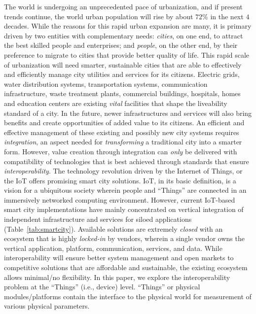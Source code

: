 \documentclass[conference]{IEEEtran}
\begin{document}
The world is undergoing an unprecedented pace of urbanization, and if present trends continue, the world urban population will rise by about $72$\% in the next $4$ decades.
While the reasons for this rapid urban expansion are many, it is primary driven by two entities with complementary needs: \emph{cities}, on one end, to attract the best skilled people and enterprises; and \emph{people}, on the other end, by their preference to migrate to cities that provide better quality of life. 
This rapid scale of urbanization will need smarter, sustainable cities that are able to effectively and efficiently manage city utilities and services for its citizens.
\newline
\indent
Electric grids, water distribution systems, transportation systems, communication infrastructure, waste treatment plants, commercial buildings, hospitals, homes and education centers are existing \emph{vital} facilities that shape the liveability standard of a city. 
In the future, newer infrastructures and services will also bring benefits and create opportunities of added value to its citizens.
An efficient and effective management of these existing and possibly new city systems requires \emph{integration}, an aspect needed for \emph{transforming} a traditional city into a smarter form. 
However, value creation through integration can \emph{only} be delivered with compatibility of technologies that is best achieved through standards that ensure \emph{interoperability}.
\newline
\indent
The technology revolution driven by the Internet of Things, or the IoT offers promising smart city solutions.
IoT, in its basic definition, is a vision for a ubiquitous society wherein people and ``Things'' are connected in an immersively networked computing environment.
However, current IoT-based smart city implementations have mainly concentrated on vertical integration of independent infrastructure and services for siloed applications (Table~\ref{tab:smartcity}).
Available solutions are extremely \emph{closed} with an ecosystem that is highly \emph{locked-in} by vendors, wherein a single vendor owns the vertical application, platform, communication, services, and data.
While interoperability will ensure better system management and open markets to competitive solutions that are affordable and sustainable, the existing ecosystem allows minimal/no flexibility.\newline
\indent
In this paper, we explore the interoperability problem at the ``Things'' (i.e., device) level.
``Things'' or physical modules/platforms contain the interface to the physical world for measurement of various physical parameters.
\end{document}
